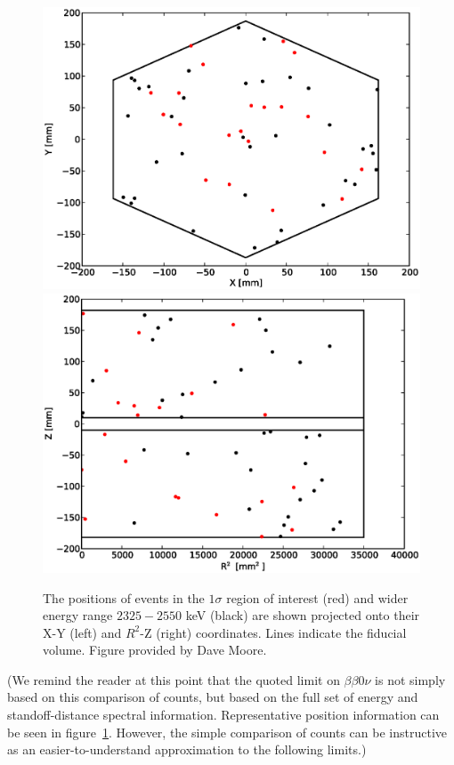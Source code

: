 \begin{figure}
\begin{center}
\includegraphics[keepaspectratio=true,width=.49\textwidth]{ROIdistribution_XY.eps}
\includegraphics[keepaspectratio=true,width=.49\textwidth]{ROIdistribution_RZ.eps}
\end{center}
\renewcommand{\baselinestretch}{1}
\small\normalsize
\begin{quote}
\caption{The positions of events in the $1\sigma$ region of interest (red) and wider energy range $2325-2550$ keV (black) are shown projected onto their X-Y (left) and $R^2$-Z (right) coordinates.  Lines indicate the fiducial volume. Figure provided by Dave Moore.}
\label{fig:ROIEventPositionDistribution}
\end{quote}
\end{figure}
\renewcommand{\baselinestretch}{2}
\small\normalsize

(We remind the reader at this point that the quoted limit on $\beta\beta 0\nu$ is not simply based on this comparison of counts, but based on the full set of energy and standoff-distance spectral information.  Representative position information can be seen in figure~\ref{fig:ROIEventPositionDistribution}.  However, the simple comparison of counts can be instructive as an easier-to-understand approximation to the following limits.)

